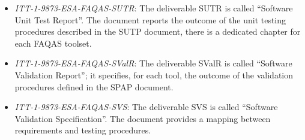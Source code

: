 \begin{itemize}
	\item \emph{ITT-1-9873-ESA-FAQAS-SUTR}: The deliverable SUTR is called ``Software Unit Test Report''. The document reports the outcome of the unit testing procedures described in the SUTP document, there is a dedicated chapter for each FAQAS toolset.

	\item \emph{ITT-1-9873-ESA-FAQAS-SValR}: The deliverable SValR is called ``Software Validation Report''; it specifies, for each tool, the outcome of the validation procedures defined in the SPAP document.

	\item \emph{ITT-1-9873-ESA-FAQAS-SVS}: The deliverable SVS is called ``Software Validation Specification''. The document provides a mapping between requirements and testing procedures.
\end{itemize}



